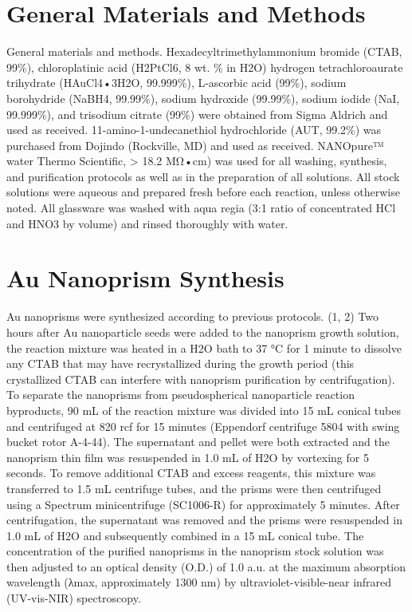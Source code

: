 \documentclass [11pt, proquest] {uwthesis}[2016/11/22]
\begin{document}
\section{General Materials and Methods}

General materials and methods. Hexadecyltrimethylammonium bromide (CTAB, 99\%), chloroplatinic acid (H2PtCl6, 8 wt. \% in H2O) hydrogen tetrachloroaurate trihydrate (HAuCl4•3H2O, 99.999\%), L-ascorbic acid (99\%), sodium borohydride (NaBH4, 99.99\%), sodium hydroxide (99.99\%), sodium iodide (NaI, 99.999\%), and trisodium citrate (99\%) were obtained from Sigma Aldrich and used as received. 11-amino-1-undecanethiol hydrochloride (AUT, 99.2\%) was purchased from Dojindo (Rockville, MD) and used as received. NANOpure™ water Thermo Scientific, > 18.2 MΩ•cm) was used for all washing, synthesis, and purification protocols as well as in the preparation of all solutions. All stock solutions were aqueous and prepared fresh before each reaction, unless otherwise noted. All glassware was washed with aqua regia (3:1 ratio of concentrated HCl and HNO3 by volume) and rinsed thoroughly with water.

\section{Au Nanoprism Synthesis}

Au nanoprisms were synthesized according to previous protocols. (1, 2) Two hours after Au nanoparticle seeds were added to the nanoprism growth solution, the reaction mixture was heated in a H2O bath to 37 °C for 1 minute to dissolve any CTAB that may have recrystallized during the growth period (this crystallized CTAB can interfere with nanoprism purification by centrifugation). To separate the nanoprisms from pseudospherical nanoparticle reaction byproducts, 90 mL of the reaction mixture was divided into 15 mL conical tubes and
centrifuged at 820 rcf for 15 minutes (Eppendorf centrifuge 5804 with swing bucket rotor A-4-44). The supernatant and pellet were both extracted and the nanoprism thin film was resuspended in 1.0 mL of H2O by vortexing for 5 seconds. To remove additional CTAB and excess reagents, this mixture was transferred to 1.5 mL centrifuge tubes, and the prisms were then centrifuged using a Spectrum minicentrifuge (SC1006-R) for approximately 5 minutes. After centrifugation, the supernatant was removed and the prisms were resuspended in 1.0 mL of H2O and subsequently combined in a 15 mL conical tube. The concentration of the purified nanoprisms in the nanoprism stock solution was then adjusted to an optical density (O.D.) of 1.0 a.u. at the maximum absorption wavelength (λmax, approximately 1300 nm) by ultraviolet-visible-near infrared (UV-vis-NIR) spectroscopy.
\end{document}
